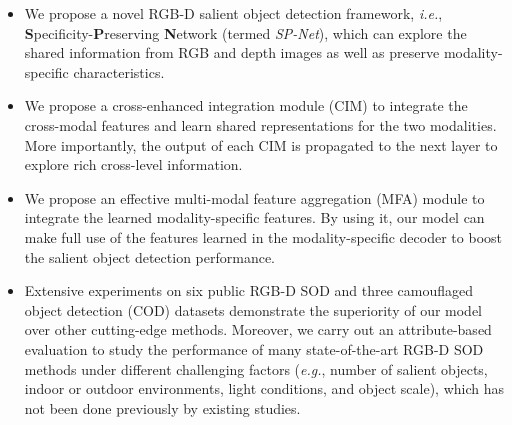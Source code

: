 \documentclass[10pt,twocolumn,letterpaper]{article}
\def\ie{\emph{i.e.}}
\def\eg{\emph{e.g.}}
\def\ours{\emph{SP-Net}}
\begin{document}
\begin{itemize}
	\vspace{4pt}
	\item We propose a novel RGB-D salient object detection framework, \ie, \textbf{S}pecificity-\textbf{P}reserving \textbf{N}etwork (termed \ours), which can explore the shared information from RGB and depth images as well as preserve modality-specific characteristics.
	
	\vspace{4pt}
	\item We propose a cross-enhanced integration module (CIM) to integrate the cross-modal features and learn shared representations for the two modalities. More importantly, the output of each CIM is propagated to the next layer to explore rich cross-level information.
	
	\vspace{4pt}
	\item We propose an effective multi-modal feature aggregation (MFA) module to integrate the learned modality-specific features. By using it, our model can make full use of the features learned in the modality-specific decoder to boost the salient object detection performance.
	
	\vspace{4pt}
	\item Extensive experiments on six public RGB-D SOD and three camouflaged object detection (COD) datasets demonstrate the superiority of our model over other cutting-edge methods. Moreover, we carry out an attribute-based evaluation to study the performance of many state-of-the-art RGB-D SOD methods under different challenging factors (\eg, number of salient objects, indoor or outdoor environments, light conditions, and object scale), which has not been done previously by existing studies.
	\vspace{4pt}
\end{itemize}
\end{document}
